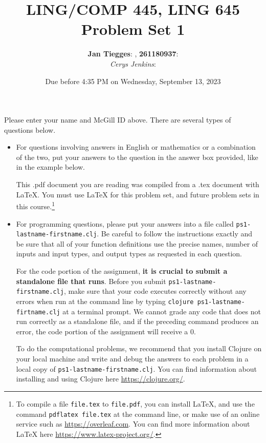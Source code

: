 \documentclass[10pt]{article}
\author{
  \textbf{Jan Tiegges}:       %
, \textbf{261180937}:  %
\\ \textit{Cerys Jenkins}:  %
}
\newcommand{\PSnum}{1}
\begin{document}
\title{LING/COMP 445, LING 645\\Problem Set \PSnum} \date{Due before 4:35 PM on
Wednesday, September 13, 2023} 
\maketitle 

Please enter your name and McGill ID
above. There are several types of questions below.
\begin{itemize}
  \item For questions involving answers in English or mathematics or a
    combination of the two, put your answers to the question in the answer box
    provided, like in the example below.

    This .pdf document you are reading was compiled from a .tex document with
    \LaTeX. You must use \LaTeX{} for this problem set, and future problem sets
    in this course.\footnote{To compile a file \texttt{file.tex} to
      \texttt{file.pdf}, you can install \LaTeX{}, and use the command
      \texttt{pdflatex file.tex} at the command line, or make use of an online
      service such as \url{https://overleaf.com}. You can find more information
    about \LaTeX{} here \url{https://www.latex-project.org/}.}

  \item For programming questions, please put your answers into a file called
    \texttt{ps\PSnum-lastname-firstname.clj}. Be careful to follow the
    instructions exactly and be sure that all of your function definitions use
    the precise names, number of inputs and input types, and output types as
    requested in each question.

    For the code portion of the assignment, \textbf{it is crucial to submit a
    standalone file that runs}. Before you submit
    \texttt{ps\PSnum-lastname-firstname.clj}, make sure that your code executes
    correctly without any errors when run at the command line by typing
    \texttt{clojure ps\PSnum-lastname-firtname.clj} at a terminal prompt. We
    cannot grade any code that does not run correctly as a standalone file, and
    if the preceding command produces an error, the code portion of the
    assignment will receive a $0$.

    To do the computational problems, we recommend that you install Clojure on
    your local machine and write and debug the answers to each problem in a
    local copy of \texttt{ps\PSnum-lastname-firstname.clj}. You can find
    information about installing and using Clojure here
    \url{https://clojure.org/}.
\end{itemize}
\end{document}

